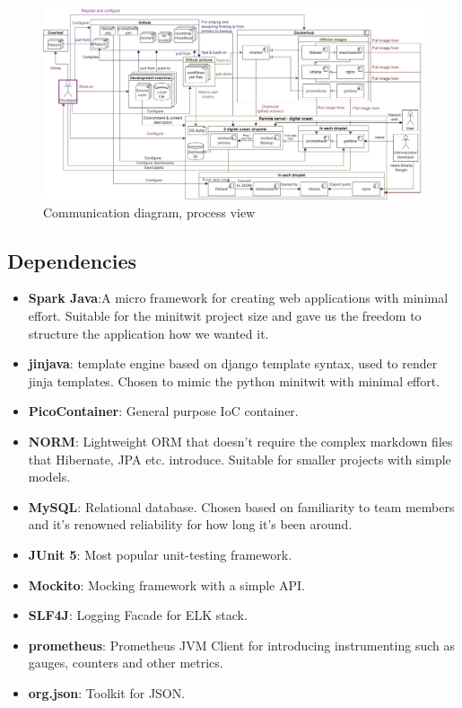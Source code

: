 \begin{figure}[H]
    \centering
    \includegraphics[width=1.0\textwidth]{images/Diagrams-Process_view_communication_diagram.jpg}
    \caption{Communication diagram, process view}
    \label{fig:componentDiagram}
\end{figure}





\subsection{Dependencies } %
\begin{itemize}
    \item \textbf{Spark Java}:A micro framework for creating web applications with minimal effort. Suitable for the minitwit project size and gave us the freedom to structure the application how we wanted it.
    \item \textbf{jinjava}: template engine based on django template syntax, used to render jinja templates. Chosen to mimic the python minitwit with minimal effort. 
    \item \textbf{PicoContainer}: General purpose IoC container.
    \item \textbf{NORM}: Lightweight ORM that doesn't require the complex markdown files that Hibernate, JPA etc. introduce. Suitable for smaller projects with simple models. 
    \item \textbf{MySQL}: Relational database. Chosen based on familiarity to team members and it's renowned reliability for how long it's been around.  
    \item \textbf{JUnit 5}: Most popular unit-testing framework.
    \item \textbf{Mockito}: Mocking framework with a simple API.
    \item \textbf{SLF4J}: Logging Facade for ELK stack. 
    \item \textbf{prometheus}: Prometheus JVM Client for introducing instrumenting such as gauges, counters and other metrics.
    \item \textbf{org.json}: Toolkit for JSON.
\end{itemize}
